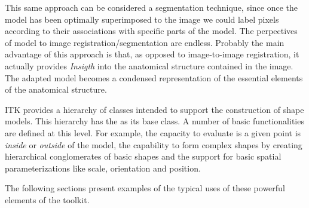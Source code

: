 This same approach can be considered a segmentation technique, since once the
model has been optimally superimposed to the image we could label pixels
according to their associations with specific parts of the model. The
perpectives of model to image registration/segmentation are endless.  Probably
the main advantage of this approach is that, as opposed to image-to-image
registration, it actually provides \emph{Insigth} into the anatomical structure
contained in the image. The adapted model becomes a condensed representation of
the essential elements of the anatomical structure.

ITK provides a hierarchy of classes intended to support the construction of
shape models. This hierarchy has the  as its base class.
A number of basic functionalities are defined at this level. For example, the
capacity to evaluate is a given point is \emph{inside} or \emph{outside} of the
model, the capability to form complex shapes by creating hierarchical
conglomerates of basic shapes and the support for basic spatial
parameterizations like scale, orientation and position.

The following sections present examples of the typical uses of these powerful
elements of the toolkit.

 




